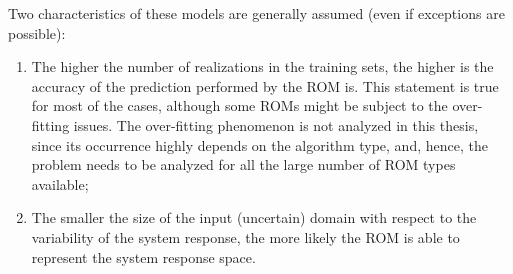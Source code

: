 Two characteristics of these models
are generally assumed (even if exceptions are possible):
\begin{enumerate}
  \item The higher the number of realizations in the training sets, the
higher is the accuracy of the prediction performed by the ROM is. This
statement is true for most of the cases, although some ROMs might be
subject to the over-fitting issues. The over-fitting phenomenon is not
analyzed in this thesis, since its occurrence highly depends on the
algorithm type, and, hence, the problem needs to be analyzed for all
the large number of ROM types available;
  \item The smaller the size of the input (uncertain) domain with
  respect to the variability of the system response, the more likely the
  ROM is able to represent the system response space.
\end{enumerate}

